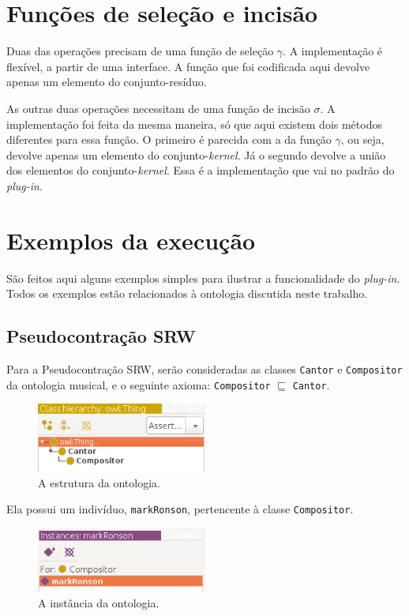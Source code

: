 \section{Funções de seleção e incisão}

Duas das operações precisam de uma função de seleção $ \gamma $. A implementação é flexível, a partir de uma interface. A função que foi codificada aqui devolve apenas um elemento do conjunto-resíduo.

As outras duas operações necessitam de uma função de incisão $ \sigma $. A implementação foi feita da mesma maneira, só que aqui existem dois métodos diferentes para essa função. O primeiro é parecida com a da função $ \gamma $, ou seja, devolve apenas um elemento do conjunto-\textit{kernel}. Já o segundo devolve a união dos elementos do conjunto-\textit{kernel}. Essa é a im\-ple\-men\-ta\-ção que vai no padrão do \textit{plug-in}.

\section{Exemplos da execução}

São feitos aqui alguns exemplos simples para ilustrar a funcionalidade do \textit{plug-in}. Todos os exemplos estão relacionados à ontologia discutida neste trabalho.

\subsection{Pseudocontração SRW}

Para a Pseudocontração SRW, serão consideradas as classes \texttt{Cantor} e \texttt{Compositor} da ontologia musical, e o seguinte axioma: \texttt{Compositor} $ \sqsubseteq $ \texttt{Cantor}.

\begin{figure}[H]
	\centering
	\includegraphics[width=0.5\textwidth]{Capitulos/Implementacao/srw1.png}
	\caption{A estrutura da ontologia.}
\end{figure}

Ela possui um indivíduo, \texttt{markRonson}, pertencente à classe \texttt{Compositor}.

\begin{figure}[H]
	\centering
	\includegraphics[width=0.5\textwidth]{Capitulos/Implementacao/srw2.png}
	\caption{A instância da ontologia.}
\end{figure}

